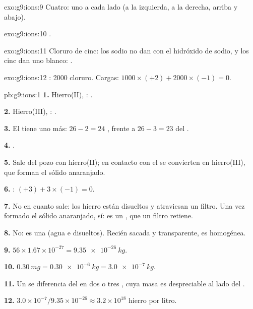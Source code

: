 \begin{solution}{exo:g9:ions:9}
Cuatro: uno a cada lado (a la izquierda, a la derecha, arriba y abajo).
\end{solution}

\begin{solution}{exo:g9:ions:10}
.
\end{solution}

\begin{solution}{exo:g9:ions:11}
Cloruro de cinc: los  sodio no dan  con el hidróxido de
sodio, y los  cinc dan uno blanco:
.
\end{solution}

\begin{solution}{exo:g9:ions:12}
: 2000  cloruro. Cargas: $1000 \times (+2) + 2000 \times
(-1) = 0$.
\end{solution}

\begin{solution}{pb:g9:ions:1}
\textbf{1.} Hierro(II), : .

\textbf{2.} Hierro(III), : .

\textbf{3.} El  tiene uno más: $26 - 2 = 24$ ,
frente a $26 - 3 = 23$ del .

\textbf{4.} .

\textbf{5.} Sale del pozo con  hierro(II); en contacto con el 
se convierten en  hierro(III), que forman el sólido anaranjado.

\textbf{6.} : $(+3) + 3 \times (-1) = 0$.

\textbf{7.} No en cuanto sale: los  hierro están disueltos y
atraviesan un filtro. Una vez formado el sólido anaranjado, sí: es un
, que un filtro retiene.

\textbf{8.} No: es una  (agua e  disueltos). Recién sacada y
transparente, es homogénea.

\textbf{9.} $56 \times 1.67 \times 10^{-27} = \qty{9.35e-26}{kg}$.

\textbf{10.} $\qty{0.30}{mg} = \qty{0.30e-6}{kg} = \qty{3.0e-7}{kg}$.

\textbf{11.} Un  se diferencia del  en dos o tres ,
cuya masa es despreciable al lado del .

\textbf{12.} $3.0 \times 10^{-7} / 9.35 \times 10^{-26} \approx 3.2
\times 10^{18}$  hierro por litro.
\end{solution}
